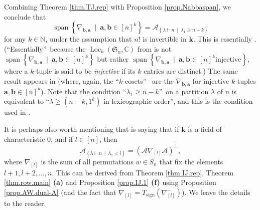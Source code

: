 \documentclass[numbers=enddot,12pt,final,onecolumn,notitlepage]{scrartcl}%
\numberwithin{exer}{subsection}
\theoremstyle{definition}
\begin{document}
Combining Theorem \ref{thm.TJ.rep} with Proposition \ref{prop.Nabbaspan}, we
conclude that%
\begin{equation}
\operatorname*{span}\left\{  \nabla_{\mathbf{b},\mathbf{a}}\ \mid
\ \mathbf{a},\mathbf{b}\in\left[  n\right]  ^{k}\right\}  =\mathcal{A}%
_{\left\{  \lambda\vdash n\ \mid\ \lambda_{1}\geq n-k\right\}  }
\label{eq.thm.TJ.rep.cor}%
\end{equation}
for any $k\in\mathbb{N}$, under the assumption that $n!$ is invertible in
$\mathbf{k}$. This is essentially \cite[Theorem 3.5]{HamRho25}.
(\textquotedblleft Essentially\textquotedblright\ because the
$\operatorname*{Loc}\nolimits_{k}\left(  \mathfrak{S}_{n},\mathbb{C}\right)  $
from \cite{HamRho25} is not $\operatorname*{span}\left\{  \nabla
_{\mathbf{b},\mathbf{a}}\ \mid\ \mathbf{a},\mathbf{b}\in\left[  n\right]
^{k}\right\}  $ but rather $\operatorname*{span}\left\{  \nabla_{\mathbf{b}%
,\mathbf{a}}\ \mid\ \mathbf{a},\mathbf{b}\in\left[  n\right]  ^{k}\text{
injective}\right\}  $, where a $k$-tuple is said to be \emph{injective} if its
$k$ entries are distinct.) The same result appears in \cite[Theorem
7]{ElFrPi11} (where, again, the \textquotedblleft$k$-cosets\textquotedblright%
\ are the $\nabla_{\mathbf{b},\mathbf{a}}$ for injective $k$-tuples
$\mathbf{a},\mathbf{b}\in\left[  n\right]  ^{k}$). Note that the condition
\textquotedblleft$\lambda_{1}\geq n-k$\textquotedblright\ on a partition
$\lambda$ of $n$ is equivalent to \textquotedblleft$\lambda\geq\left(
n-k,1^{k}\right)  $ in lexicographic order\textquotedblright, and this is the
condition used in \cite[Theorem 7]{ElFrPi11}.

It is perhaps also worth mentioning that \cite[Lemma 3]{EveZoh20} is saying
that if $\mathbf{k}$ is a field of characteristic $0$, and if $l\in\left[
n\right]  $, then%
\begin{equation}
\mathcal{A}_{\left\{  \lambda\vdash n\ \mid\ \lambda_{1}<l\right\}  }=\left(
\mathcal{A}\nabla_{\left[  l\right]  }\mathcal{A}\right)  ^{\perp},
\end{equation}
where $\nabla_{\left[  l\right]  }$ is the sum of all permutations $w\in
S_{n}$ that fix the elements $l+1,l+2,\ldots,n$. This can be derived from
Theorem \ref{thm.IJ.rep}, Theorem \ref{thm.row.main} \textbf{(a)} and
Proposition \ref{prop.IJ.1} \textbf{(f)} using Proposition
\ref{prop.AW.dual-A} (and the fact that $\nabla_{\left[  l\right]
}=T_{\operatorname*{sign}}\left(  \nabla_{\left[  l\right]  }^{-}\right)  $).
We leave the details to the reader.
\end{document}
